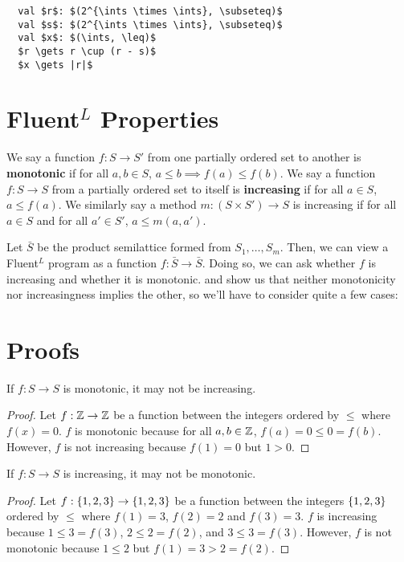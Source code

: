 \documentclass{mwhittaker}
\newcommand{\fluentl}{Fluent$^L$}
\begin{document}
\begin{lstlisting}
  val $r$: $(2^{\ints \times \ints}, \subseteq)$
  val $s$: $(2^{\ints \times \ints}, \subseteq)$
  val $x$: $(\ints, \leq)$
  $r \gets r \cup (r - s)$
  $x \gets |r|$
\end{lstlisting}

\section*{\fluentl{} Properties}
We say a function $f: S \to S'$ from one partially ordered set to another is
\textbf{monotonic} if for all $a, b \in S$, $a \leq b \implies f(a) \leq f(b)$.
%
We say a function $f: S \to S$ from a partially ordered set to itself is
\textbf{increasing} if for all $a \in S$, $a \leq f(a)$.
%
We similarly say a method $m: (S \times S') \to S$ is increasing if for all $a
\in S$ and for all $a' \in S'$, $a \leq m(a, a')$.

Let $\bar{S}$ be the product semilattice formed from $S_1, \ldots, S_m$. Then,
we can view a \fluentl{} program as a function $f: \bar{S} \to \bar{S}$. Doing
so, we can ask whether $f$ is increasing and whether it is monotonic.
 and  show us
that neither monotonicity nor increasingness implies the other, so we'll have
to consider quite a few cases:

\section*{Proofs}
\begin{claim}\label{clm:monotonic-to-increasing}
  If $f: S \to S$ is monotonic, it may not be increasing.
\end{claim}
\begin{proof}
  Let $f: \mathbb{Z} \to \mathbb{Z}$ be a function between the integers ordered by $\leq$
  where $f(x) = 0$. $f$ is monotonic because for all $a, b \in \mathbb{Z}$, $f(a) =
  0 \leq 0 = f(b)$. However, $f$ is not increasing because $f(1) = 0$ but $1 >
  0$.
\end{proof}

\begin{claim}\label{clm:increasing-to-monotonic}
  If $f: S \to S$ is increasing, it may not be monotonic.
\end{claim}
\begin{proof}
  Let $f: \{1,2,3\} \to \{1,2,3\}$ be a function between the integers
  $\{1, 2, 3\}$ ordered by $\leq$ where $f(1) = 3$, $f(2) = 2$ and $f(3) =
  3$. $f$ is increasing because $1 \leq 3 = f(3)$, $2 \leq 2 = f(2)$, and $3
  \leq 3 = f(3)$. However, $f$ is not monotonic because $1 \leq 2$ but $f(1) =
  3 > 2 = f(2)$.
\end{proof}
\end{document}
